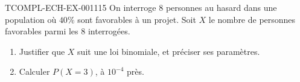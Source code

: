 \begin{exercice}{TCOMPL-ECH-EX-001}{1}{15}
On interroge $8$ personnes au hasard dans une population où $40\%$ sont favorables à un projet. Soit $X$ le nombre de personnes favorables parmi les $8$ interrogées.
\begin{enumerate}
  \item Justifier que $X$ suit une loi binomiale, et préciser ses paramètres.
  \item Calculer $P(X=3)$, à $10^{-4}$ près.
\end{enumerate}
\end{exercice}

